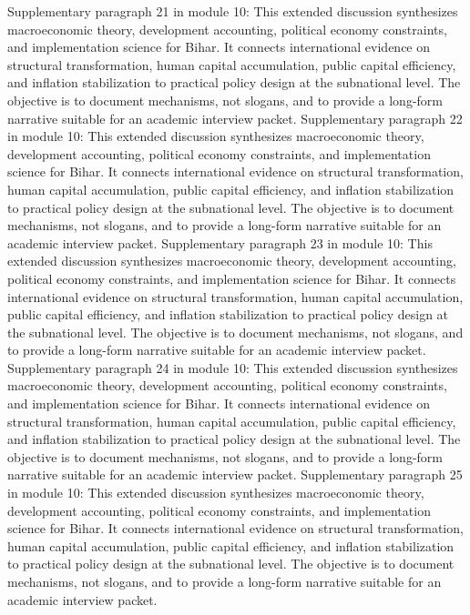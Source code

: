 \documentclass[preprint,12pt]{elsarticle}
\begin{document}
Supplementary paragraph 21 in module 10: This extended discussion synthesizes macroeconomic theory, development accounting, political economy constraints, and implementation science for Bihar. It connects international evidence on structural transformation, human capital accumulation, public capital efficiency, and inflation stabilization to practical policy design at the subnational level. The objective is to document mechanisms, not slogans, and to provide a long-form narrative suitable for an academic interview packet.
Supplementary paragraph 22 in module 10: This extended discussion synthesizes macroeconomic theory, development accounting, political economy constraints, and implementation science for Bihar. It connects international evidence on structural transformation, human capital accumulation, public capital efficiency, and inflation stabilization to practical policy design at the subnational level. The objective is to document mechanisms, not slogans, and to provide a long-form narrative suitable for an academic interview packet.
Supplementary paragraph 23 in module 10: This extended discussion synthesizes macroeconomic theory, development accounting, political economy constraints, and implementation science for Bihar. It connects international evidence on structural transformation, human capital accumulation, public capital efficiency, and inflation stabilization to practical policy design at the subnational level. The objective is to document mechanisms, not slogans, and to provide a long-form narrative suitable for an academic interview packet.
Supplementary paragraph 24 in module 10: This extended discussion synthesizes macroeconomic theory, development accounting, political economy constraints, and implementation science for Bihar. It connects international evidence on structural transformation, human capital accumulation, public capital efficiency, and inflation stabilization to practical policy design at the subnational level. The objective is to document mechanisms, not slogans, and to provide a long-form narrative suitable for an academic interview packet.
Supplementary paragraph 25 in module 10: This extended discussion synthesizes macroeconomic theory, development accounting, political economy constraints, and implementation science for Bihar. It connects international evidence on structural transformation, human capital accumulation, public capital efficiency, and inflation stabilization to practical policy design at the subnational level. The objective is to document mechanisms, not slogans, and to provide a long-form narrative suitable for an academic interview packet.
\end{document}
